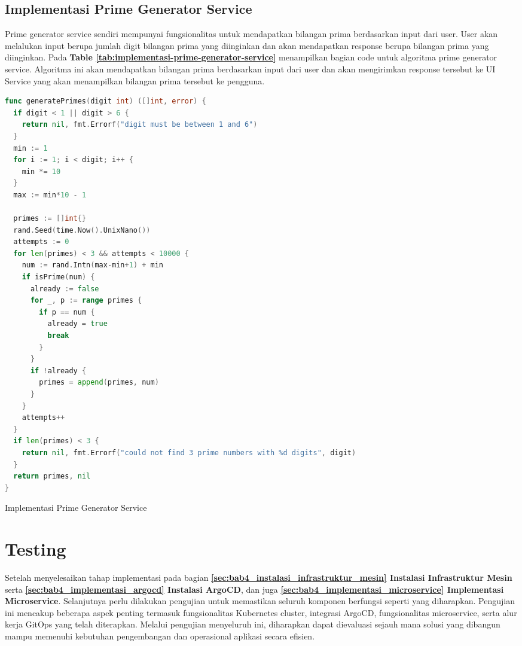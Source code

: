 \subsection{Implementasi Prime Generator Service}
Prime generator service sendiri mempunyai fungsionalitas untuk mendapatkan
bilangan prima berdasarkan input dari user. User akan melalukan input berupa
jumlah digit bilangan prima yang diinginkan dan akan mendapatkan response
berupa bilangan prima yang diinginkan. Pada \textbf{Table
  \ref{tab:implementasi-prime-generator-service}} menampilkan bagian code untuk
algoritma prime generator service. Algoritma ini akan mendapatkan bilangan
prima berdasarkan input dari user dan akan mengirimkan response tersebut ke UI
Service yang akan menampilkan bilangan prima tersebut ke pengguna.

\begin{table}[H]
  \centering
  \begin{minipage}{0.95\linewidth}
    \begin{lstlisting}[language=go, basicstyle=\footnotesize\ttfamily]
func generatePrimes(digit int) ([]int, error) {
  if digit < 1 || digit > 6 {
    return nil, fmt.Errorf("digit must be between 1 and 6")
  }
  min := 1
  for i := 1; i < digit; i++ {
    min *= 10
  }
  max := min*10 - 1

  primes := []int{}
  rand.Seed(time.Now().UnixNano())
  attempts := 0
  for len(primes) < 3 && attempts < 10000 {
    num := rand.Intn(max-min+1) + min
    if isPrime(num) {
      already := false
      for _, p := range primes {
        if p == num {
          already = true
          break
        }
      }
      if !already {
        primes = append(primes, num)
      }
    }
    attempts++
  }
  if len(primes) < 3 {
    return nil, fmt.Errorf("could not find 3 prime numbers with %d digits", digit)
  }
  return primes, nil
}
    \end{lstlisting}
  \end{minipage}
  \caption{Implementasi Prime Generator Service}
  \label{tab:implementasi-prime-generator-service}
\end{table}

\section{Testing}
Setelah menyelesaikan tahap implementasi pada bagian
\textbf{\ref{sec:bab4_instalasi_infrastruktur_mesin} Instalasi Infrastruktur
  Mesin} serta \textbf{\ref{sec:bab4_implementasi_argocd} Instalasi ArgoCD}, dan
juga \textbf{\ref{sec:bab4_implementasi_microservice} Implementasi
  Microservice}. Selanjutnya perlu dilakukan pengujian untuk memastikan seluruh
komponen berfungsi seperti yang diharapkan. Pengujian ini mencakup beberapa
aspek penting termasuk fungsionalitas Kubernetes cluster, integrasi ArgoCD,
fungsionalitas microservice, serta alur kerja GitOps yang telah diterapkan.
Melalui pengujian menyeluruh ini, diharapkan dapat dievaluasi sejauh mana
solusi yang dibangun mampu memenuhi kebutuhan pengembangan dan operasional
aplikasi secara efisien.

